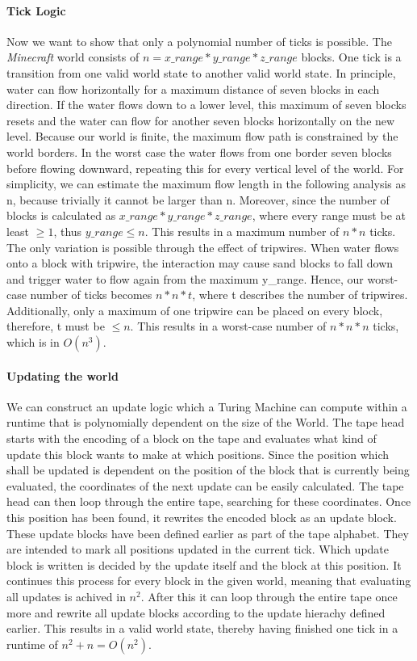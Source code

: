 	\paragraph{Tick Logic}
	Now we want to show that only a polynomial number of ticks is possible.
    \newline The \textit{Minecraft} world consists of $n = x\_range * y\_range * z\_range$ blocks. One tick is a transition from one valid world state to another valid world state. In principle, water can flow horizontally for a maximum distance of seven blocks in each direction. If the water flows down to a lower level, this maximum of seven blocks resets and the water can flow for another seven blocks horizontally on the new level. Because our world is finite, the maximum flow path is constrained by the world borders. In the worst case the water flows from one border seven blocks before flowing downward, repeating this for every vertical level of the world. For simplicity, we can estimate the maximum flow length in the following analysis as n, because trivially it cannot be larger than n. Moreover, since the number of blocks is calculated as $x\_range * y\_range * z\_range$, where every range must be at least $\geq 1$, thus $y\_range \leq n$. This results in a maximum number of $n * n$ ticks. The only variation is possible through the effect of tripwires. When water flows onto a block with tripwire, the interaction may cause sand blocks to fall down and trigger water to flow again from the maximum y\_range. Hence, our worst-case number of ticks becomes $n * n * t$, where t describes the number of tripwires. Additionally, only a maximum of one tripwire can be placed on every block, therefore, t must be $\leq n$. This results in a worst-case number of $n * n * n$ ticks, which is in $O(n^{3})$.
	
	\pagebreak
	\paragraph{Updating the world}
	We can construct an update logic which a Turing Machine can compute within a runtime that is polynomially dependent on the size of the World.
	The tape head starts with the encoding of a block on the tape and evaluates what kind of update this block wants to make at which positions.
	Since the position which shall be updated is dependent on the position of the block that is currently being evaluated, the coordinates of the next update can be easily calculated.
	The tape head can then loop through the entire tape, searching for these coordinates.
	Once this position has been found, it rewrites the encoded block as an update block.
	These update blocks have been defined earlier as part of the tape alphabet. They are intended to mark all positions updated in the current tick.
	Which update block is written is decided by the update itself and the block at this position.
	It continues this process for every block in the given world, meaning that evaluating all updates is achived in $n^2$.
	After this it can loop through the entire tape once more and rewrite all update blocks according to the update hierachy defined earlier.
	This results in a valid world state, thereby having finished one tick in a runtime of $n^{2} + n = O(n^{2})$.
 

